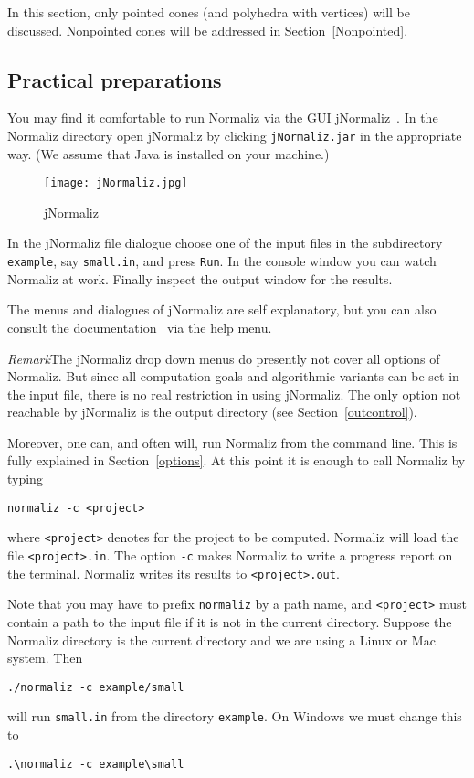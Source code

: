 \documentclass[12pt,a4paper]{scrartcl}
\theoremstyle{definition}
\def\ttt{\texttt}
\begin{document}
In this section, only pointed cones (and polyhedra with vertices) will be discussed. Nonpointed cones will be addressed in Section~\ref{Nonpointed}.


\subsection{Practical preparations}

You may find it comfortable to run Normaliz via the GUI jNormaliz~\cite{AI}. In the Normaliz directory open jNormaliz by clicking
\ttt{jNormaliz.jar} in the appropriate way. (We assume that
Java is installed on your machine.)
\begin{figure}[bht]
	\centering
	\texttt{[image: jNormaliz.jpg]}\\%
	\caption{jNormaliz}\label{new}
\end{figure}
In the jNormaliz file dialogue choose one of the input files
in the subdirectory \ttt{example}, say \ttt{small.in}, and
press \ttt{Run}. In the console window you can watch Normaliz
at work. Finally inspect the output window for the results.

The menus and dialogues of jNormaliz are self explanatory, but you
can also consult the documentation~\cite{AI} via the help menu.

\emph{Remark}\enspace The jNormaliz drop down menus do presently not cover all options of Normaliz. But since all computation goals and algorithmic variants can be set in the input file, there is no real restriction in using jNormaliz. The only option not reachable by jNormaliz is the output directory (see Section~\ref{outcontrol}).

Moreover, one can, and often will, run Normaliz from the
command line. This is fully explained in Section~\ref{options}. At this point it is enough to call Normaliz by typing
\begin{Verbatim}
normaliz -c <project>
\end{Verbatim}
where \ttt{<project>} denotes for the project to be computed. Normaliz will load the file \ttt{<project>.in}. The option \verb|-c| makes Normaliz to write a progress report on the terminal. Normaliz writes its results to \verb|<project>.out|.

Note that you may have to prefix \ttt{normaliz} by a path name, and \ttt{<project>} must contain a path to the input file if it is not in the current directory. Suppose the Normaliz directory is the current directory and we are using a Linux or Mac system. Then
\begin{Verbatim}
./normaliz -c example/small
\end{Verbatim}
will run \ttt{small.in} from the directory \ttt{example}. On Windows we must change this to
\begin{Verbatim}
.\normaliz -c example\small
\end{Verbatim}
\end{document}
